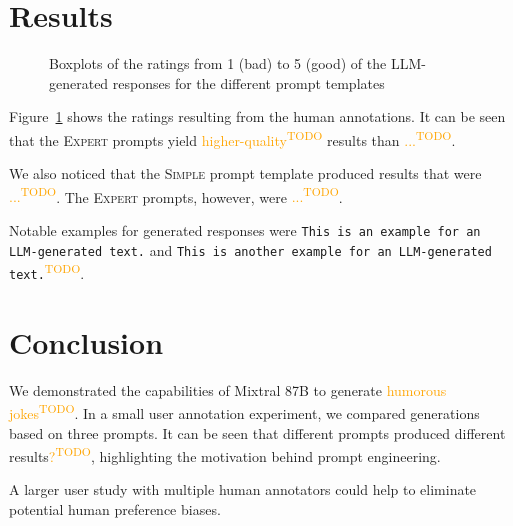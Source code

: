 \documentclass[11pt]{article}
\newcommand{\todo}[1]{\textcolor{orange}{#1\textsuperscript{\footnotesize TODO}}}
\begin{document}
\section{Results}
\begin{figure}\centering
  
  \caption{Boxplots of the ratings from 1 (bad) to 5 (good) of the LLM-generated responses for the different prompt templates}
  \label{fig:boxplots}
\end{figure}


Figure~\ref{fig:boxplots} shows the ratings resulting from the human annotations.
It can be seen that the \textsc{Expert} prompts yield \todo{higher-quality} results than \todo{...}.

We also noticed that the \textsc{Simple} prompt template produced results that were \todo{...}. The \textsc{Expert} prompts, however, were \todo{...}.

Notable examples for generated responses were \texttt{This is an example for an LLM-generated text.} and  \texttt{This is another example for an LLM-generated text.}\todo{}.


\section{Conclusion}

We demonstrated the capabilities of Mixtral 8\texttimes 7B to generate \todo{humorous jokes}. In a small user annotation experiment, we compared generations based on three prompts.
It can be seen that different prompts produced different results\todo{?}, highlighting the motivation behind prompt engineering.

A larger user study with multiple human annotators could help to eliminate potential human preference biases.


\end{document}
